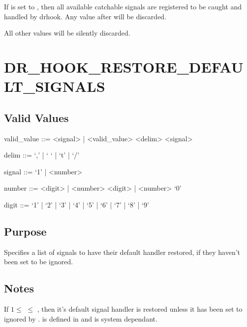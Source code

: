 \documentclass[letterpaper,10pt,english]{sphinxmanual}
\begin{document}
\sphinxAtStartPar
If  is set to , then all available catchable signals are registered to be caught and handled by drhook. Any value after  will be discarded.

\sphinxAtStartPar
All other values will be silently discarded.


\section{DR\_HOOK\_RESTORE\_DEFAULT\_SIGNALS}
\label{\detokenize{flag/flag:dr-hook-restore-default-signals}}\label{\detokenize{flag/flag:id13}}

\subsection{Valid Values}
\label{\detokenize{flag/flag:id14}}
\begin{DUlineblock}{0em}
\item[] valid\_value ::= \textless{}signal\textgreater{} |  \textless{}valid\_value\textgreater{} \textless{}delim\textgreater{} \textless{}signal\textgreater{}
\item[] delim ::= ‘,’ | ‘ ‘ | ‘t’ | ‘/’
\item[] signal ::= ‘\sphinxhyphen{}1’ | \textless{}number\textgreater{}
\item[] number ::= \textless{}digit\textgreater{} | \textless{}number\textgreater{} \textless{}digit\textgreater{} | \textless{}number\textgreater{} ‘0’
\item[] digit ::= ‘1’ | ‘2’ | ‘3’ | ‘4’ | ‘5’ | ‘6’ | ‘7’ | ‘8’ | ‘9’
\end{DUlineblock}


\subsection{Purpose}
\label{\detokenize{flag/flag:id15}}
\sphinxAtStartPar
Specifies a list of signals to have their default handler restored, if they haven’t been set to be ignored.


\subsection{Notes}
\label{\detokenize{flag/flag:id16}}
\sphinxAtStartPar
If \(1 \leq\)  \(\leq\) , then it’s default signal handler is restored \sphinxhyphen{} unless it has been set to ignored by
{\hyperref[\detokenize{flag/flag:dr-hook-ignore-signals}]{}}.  is defined in  and is system dependant.
\end{document}
